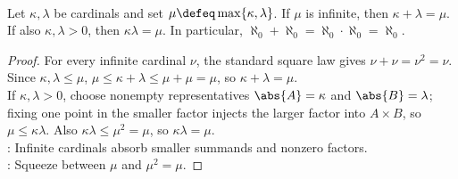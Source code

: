 \begin{theorem} \label{thm:infinite-cardinal-absorption-reference} \\
Let $\kappa,\lambda$ be cardinals and set $\mu\defeq\max\{\kappa,\lambda\}$. If $\mu$ is infinite, then $\kappa+\lambda=\mu$.\\
If also $\kappa,\lambda>0$, then $\kappa\lambda=\mu$. In particular, $\aleph_0+\aleph_0=\aleph_0\cdot\aleph_0=\aleph_0$.
\begin{proof}
For every infinite cardinal $\nu$, the standard square law gives $\nu+\nu=\nu^2=\nu$.\\
Since $\kappa,\lambda\leq\mu$, $\mu\leq \kappa+\lambda\leq\mu+\mu=\mu$, so $\kappa+\lambda=\mu$.\\
If $\kappa,\lambda>0$, choose nonempty representatives $\abs{A}=\kappa$ and $\abs{B}=\lambda$; fixing one point in the smaller factor injects the larger factor into $A\times B$, so $\mu\leq\kappa\lambda$. Also $\kappa\lambda\leq\mu^2=\mu$, so $\kappa\lambda=\mu$.\\
: Infinite cardinals absorb smaller summands and nonzero factors.\\
: Squeeze between $\mu$ and $\mu^2=\mu$.
\end{proof}
\end{theorem}
